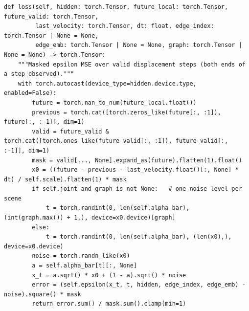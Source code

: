 \documentclass[10pt]{article}
\begin{document}
\begin{lstlisting}[aboveskip=2pt]
def loss(self, hidden: torch.Tensor, future_local: torch.Tensor, future_valid: torch.Tensor,
         last_velocity: torch.Tensor, dt: float, edge_index: torch.Tensor | None = None,
         edge_emb: torch.Tensor | None = None, graph: torch.Tensor | None = None) -> torch.Tensor:
    """Masked epsilon MSE over valid displacement steps (both ends of a step observed)."""
    with torch.autocast(device_type=hidden.device.type, enabled=False):
        future = torch.nan_to_num(future_local.float())
        previous = torch.cat([torch.zeros_like(future[:, :1]), future[:, :-1]], dim=1)
        valid = future_valid & torch.cat([torch.ones_like(future_valid[:, :1]), future_valid[:, :-1]], dim=1)
        mask = valid[..., None].expand_as(future).flatten(1).float()
        x0 = ((future - previous - last_velocity.float()[:, None] * dt) / self.scale).flatten(1) * mask
        if self.joint and graph is not None:   # one noise level per scene
            t = torch.randint(0, len(self.alpha_bar), (int(graph.max()) + 1,), device=x0.device)[graph]
        else:
            t = torch.randint(0, len(self.alpha_bar), (len(x0),), device=x0.device)
        noise = torch.randn_like(x0)
        a = self.alpha_bar[t][:, None]
        x_t = a.sqrt() * x0 + (1 - a).sqrt() * noise
        error = (self.epsilon(x_t, t, hidden, edge_index, edge_emb) - noise).square() * mask
        return error.sum() / mask.sum().clamp(min=1)

\end{lstlisting}
\end{document}
